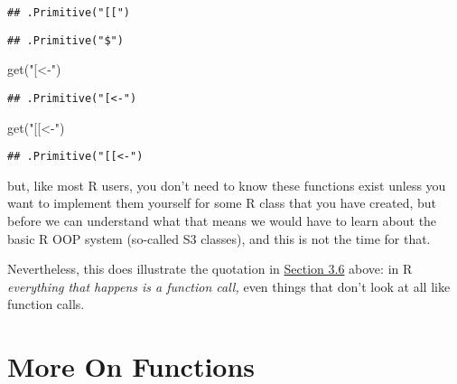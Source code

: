\documentclass[
]{article}
\newenvironment{Shaded}{\begin{snugshade}}{\end{snugshade}}
\newcommand{\FunctionTok}[1]{\textcolor[rgb]{0.00,0.00,0.00}{#1}}
\newcommand{\NormalTok}[1]{#1}
\newcommand{\StringTok}[1]{\textcolor[rgb]{0.31,0.60,0.02}{#1}}
\begin{document}
\begin{verbatim}
## .Primitive("[[")
\end{verbatim}

\begin{Shaded}
\end{Shaded}

\begin{verbatim}
## .Primitive("$")
\end{verbatim}

\begin{Shaded}
\begin{Highlighting}[]
\FunctionTok{get}\NormalTok{(}\StringTok{"[\textless{}{-}"}\NormalTok{)}
\end{Highlighting}
\end{Shaded}

\begin{verbatim}
## .Primitive("[<-")
\end{verbatim}

\begin{Shaded}
\begin{Highlighting}[]
\FunctionTok{get}\NormalTok{(}\StringTok{"[[\textless{}{-}"}\NormalTok{)}
\end{Highlighting}
\end{Shaded}

\begin{verbatim}
## .Primitive("[[<-")
\end{verbatim}

but, like most R users, you don't need to know these functions exist
unless you want to implement them yourself for some R class that you
have created, but before we can understand what that means we would have
to learn about the basic R OOP system (so-called S3 classes), and this
is not the time for that.

Nevertheless, this does illustrate the quotation in
\protect\hyperlink{objects}{Section 3.6} above: in R \emph{everything
that happens is a function call,} even things that don't look at all
like function calls.

\hypertarget{more-on-functions}{%
\section{More On Functions}\label{more-on-functions}}
\end{document}
